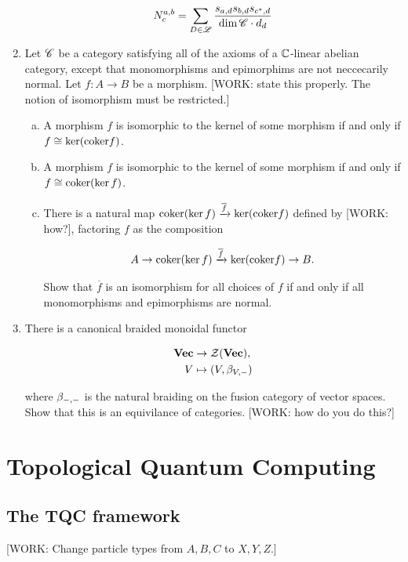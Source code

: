 \documentclass{article}
\theoremstyle{definition}
\numberwithin{figure}{section}
\begin{document}
\begin{enumerate}[\thesection .1.]
$$N^{a,b}_{c}=\sum_{D\in \mathscr{L}} \frac{s_{a,d} s_{b,d}s_{c^*,d}}{\dim{\mathscr{C}}\cdot d_d}$$

\item Let $\mathscr{C}$ be a category satisfying all of the axioms of a $\mathbb{C}$-linear abelian category, except that monomorphisms and epimorphims are not neccecarily normal. Let $f:A\to B$ be a morphism. [WORK: state this properly. The notion of isomorphism must be restricted.]

\begin{enumerate}[(a)]
\item A morphism $f$ is isomorphic to the kernel of some morphism if and only if $f\cong \ker(\mathrm{coker} f)$.
\item A morphism $f$ is isomorphic to the kernel of some morphism if and only if $f\cong \mathrm{coker}(\ker f)$.
\item There is a natural map $\mathrm{coker}(\ker f)\xrightarrow{\overline{f}} \ker(\mathrm{coker} f)$ defined by [WORK: how?], factoring $f$ as the composition

$$A\to \mathrm{coker}(\ker f)\xrightarrow{\overline{f}}\ker(\mathrm{coker} f)\to B.$$

Show that $\overline{f}$ is an isomorphism for all choices of $f$ if and only if all monomorphisms and epimorphisms are normal.
\end{enumerate}

\item There is a canonical braided monoidal functor

\begin{align*}
\bold{Vec} &\to \mathcal{Z}(\bold{Vec}),\\
V &\mapsto (V,\beta_{V,\--})
\end{align*}

where $\beta_{\--,\--}$ is the natural braiding on the fusion category of vector spaces. Show that this is an equivilance of categories. [WORK: how do you do this?]
\end{enumerate}

\section{Topological Quantum Computing}
\label{Topological Quantum Computing}

\subsection{The TQC framework}
\label{The TQC framework}

[WORK: Change particle types from $A,B,C$ to $X,Y,Z$.]
\end{document}
